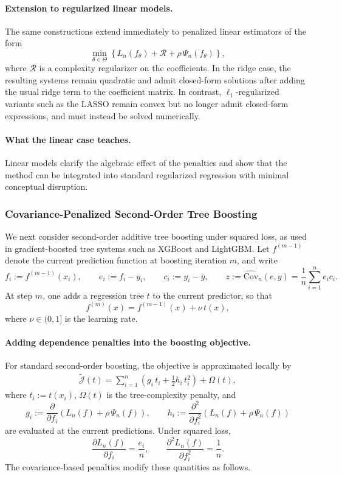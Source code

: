 \documentclass[12pt, draft]{article}
\theoremstyle{plain}
\theoremstyle{definition}
\newcommand{\1}{\mathbf{1}}
\newcommand{\Cov}{\text{Cov}}
\begin{document}
{\paragraph{Extension to regularized linear models.}
The same constructions extend immediately to penalized linear estimators of the form
\[
\min_{\theta\in\Theta}
\left\{
    L_n(f_\theta) + \mathcal{R} + \rho\,\Psi_n(f_\theta)
\right\},
\]
where \(\mathcal{R}\) is a complexity regularizer on the coefficients. In the ridge case, the resulting systems remain quadratic and admit closed-form solutions after adding the usual ridge term to the coefficient matrix. In contrast, \(\ell_1\)-regularized variants such as the LASSO remain convex but no longer admit closed-form expressions, and must instead be solved numerically.

\paragraph{What the linear case teaches.}
Linear models clarify the algebraic effect of the penalties and show that the method can be integrated into standard regularized regression with minimal conceptual disruption.

\subsubsection{Covariance-Penalized Second-Order Tree Boosting}
\label{subsec:tree_boosting}

We next consider second-order additive tree boosting under squared loss, as used in gradient-boosted tree systems such as XGBoost and LightGBM. Let \(f^{(m-1)}\) denote the current prediction function at boosting iteration \(m\), and write
\[
f_i := f^{(m-1)}(x_i),
\qquad
e_i := f_i - y_i,
\qquad
c_i := y_i - \bar y,
\qquad
z := \widehat{\Cov}_n(e,y) = \frac{1}{n}\sum_{i=1}^n e_i c_i.
\]
At step \(m\), one adds a regression tree \(t\) to the current predictor, so that
\[
f^{(m)}(x) = f^{(m-1)}(x) + \nu\,t(x),
\]
where \(\nu\in(0,1]\) is the learning rate.

\paragraph{Adding dependence penalties into the boosting objective.}
For standard second-order boosting, the objective is approximated locally by
\begin{align}
    \label{eq:boosting_local_objective}
    \widetilde{\mathcal J}(t)
    =
    \sum_{i=1}^n
    \left(
        g_i\,t_i + \frac{1}{2}h_i\,t_i^2
    \right)
    +
    \Omega(t),
\end{align}
where \(t_i := t(x_i)\), \(\Omega(t)\) is the tree-complexity penalty, and
\[
g_i := \frac{\partial}{\partial f_i}
\left(
L_n(f) + \rho\,\Psi_n(f)
\right),
\qquad
h_i := \frac{\partial^2}{\partial f_i^2}
\left(
L_n(f) + \rho\,\Psi_n(f)
\right)
\]
are evaluated at the current predictions. Under squared loss,
\[
\frac{\partial L_n(f)}{\partial f_i} = \frac{e_i}{n},
\qquad
\frac{\partial^2 L_n(f)}{\partial f_i^2} = \frac{1}{n}.
\]
The covariance-based penalties modify these quantities as follows.

}
\end{document}
